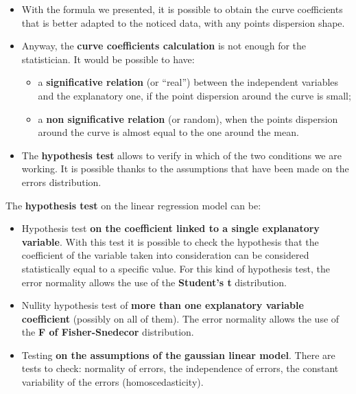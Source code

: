 \begin{frame}
  \vspace*{.25cm}
  \begin{itemize}
    \item With the formula we presented, it is possible to obtain the curve coefficients that is better adapted to the noticed data, with any points dispersion shape.  
    \item Anyway, the \textbf{curve coefficients calculation} is not enough for the statistician. It would be possible to have:
    \begin{itemize}
      \item a \textbf{significative relation} (or ``real'') between the independent variables and the explanatory one, if the point dispersion around the curve is small;
      \item a \textbf{non significative relation} (or random), when the points dispersion  around the curve is almost equal to the one around the mean.
    \end{itemize}
    \item The \textbf{hypothesis test} allows to verify in which of the two conditions we are working. It is possible thanks to the assumptions that have been made on the errors distribution. 
  \end{itemize}
\end{frame}

\begin{frame}
  The \textbf{hypothesis test} on the linear regression model can be:
  \begin{itemize}
    \item Hypothesis test \textbf{on the coefficient linked to a single explanatory variable}. With this test it is possible to check the hypothesis that the coefficient of the variable taken into consideration can be considered statistically equal to a specific value. For this kind of hypothesis test, the error normality allows the use of the \textbf{Student's t} distribution.
    \item Nullity hypothesis test of \textbf{more than one explanatory variable coefficient} (possibly on all of them). The error normality allows the use of the \textbf{F of Fisher-Snedecor} distribution.
    \item Testing \textbf{on the assumptions of the gaussian linear model}. There are tests to check: normality of errors, the independence of errors,  the constant variability of the errors (homoscedasticity).
  \end{itemize}
\end{frame}


